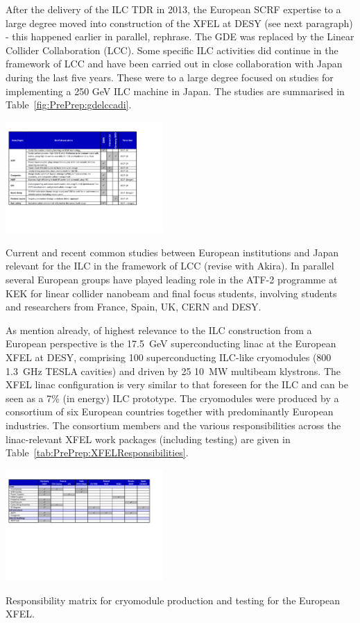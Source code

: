\documentclass[%
 reprint,
 amsmath,amssymb,
 aps,
]{revtex4-1}
\begin{document}
\vspace{0.15cm}
After the delivery of the ILC TDR in 2013, the European SCRF expertise to a large degree moved into construction of the 
XFEL at DESY (see next paragraph) - this happened earlier in parallel, rephrase. The GDE was replaced by the Linear Collider Collaboration (LCC). Some specific ILC activities did continue in the framework of LCC and have been carried out in close collaboration with Japan during the last five years. These were to a large degree focused on studies for implementing a 250 GeV ILC machine in Japan. The studies are summarised in Table~\ref{fig:PrePrep:gdelccadi}. 

\begin{table}[htbp]
\includegraphics[width=0.45\textwidth]{figures/ILCEAP-Matrices-LCCADI.pdf}
\caption{\label{fig:PrePrep:gdelccadi} Current and recent common studies between European institutions and Japan relevant for the ILC in the framework of LCC (revise with Akira). In parallel several European groups have played leading role in the ATF-2 programme at KEK for linear collider nanobeam and final focus students, involving students and researchers from France, Spain, UK, CERN and DESY.}
\end{table}

\vspace{0.15cm}
As mention already, of highest relevance to the ILC construction from a European perspective is the 17.5~GeV superconducting linac at the European XFEL at DESY, comprising 100 superconducting ILC-like cryomodules (800 1.3~GHz TESLA cavities) and driven by 25 10~MW multibeam klystrons. The XFEL linac configuration is very similar to that foreseen for the ILC and can be seen as a 7\% (in energy) ILC prototype. The cryomodules were produced by a consortium of six European countries together with predominantly European industries. The consortium members and the various responsibilities across the linac-relevant XFEL work packages (including testing) are given in Table~\ref{tab:PrePrep:XFELResponsibilities}.

\begin{table}[htbp]
\includegraphics[width=0.45\textwidth]{figures/ILCEAP-Matrices-XFEL.pdf}
\caption{\label{tab:PrePrep:XFELResponsibilities} Responsibility matrix for cryomodule production and testing for the European XFEL.} 
\end{table}
\end{document}
